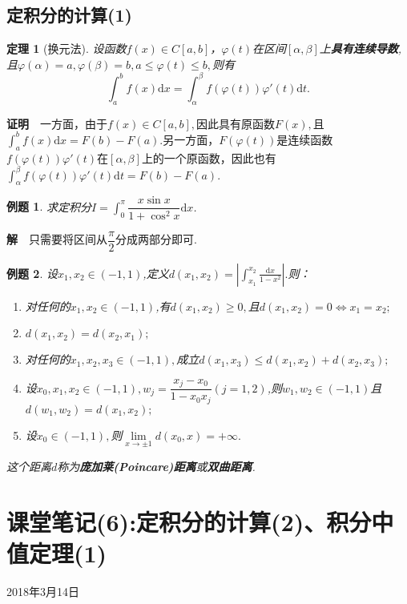 \documentclass[UTF8]{article}
\newcommand{\dx}{\mathrm{d}x}
\newcommand{\zm}{\textbf{证明}$\quad$}
\newcommand{\jie}{\textbf{解}$\quad$}
\newtheorem{thm}{\hspace{2em}定理}[section]
\newtheorem{exa}{\hspace{2em}例题}[section]
\begin{document}
\subsection{定积分的计算(1)}
\begin{thm}[换元法]
  设函数$f(x)\in C[a,b]$，$\varphi(t)$在区间$[\alpha,\beta]$上\textbf{具有连续导数},且$\varphi(\alpha)=a,\varphi(\beta)=b,
  a\le\varphi(t)\le b,$则有
  $$\int_a^bf(x)\dx=\int_\alpha^\beta f(\varphi(t))\varphi'(t)\mathrm{d}t.$$
\end{thm}
\zm 一方面，由于$f(x)\in C[a,b],$因此具有原函数$F(x),$且$\int_a^bf(x)\dx=F(b)-F(a).$另一方面，$F(\varphi(t))$是连续函数
$f(\varphi(t))\varphi'(t)$在$[\alpha,\beta]$上的一个原函数，因此也有$\int_\alpha^\beta f(\varphi(t))\varphi'(t)\mathrm{d}t
=F(b)-F(a).$
\begin{exa}
  求定积分$I=\displaystyle\int_0^\pi\dfrac{x\sin x}{1+\cos^2x}\dx$.
\end{exa}
\jie 只需要将区间从$\dfrac{\pi}{2}$分成两部分即可.
\begin{exa}
  设$x_1,x_2\in(-1,1)$,定义$d(x_1,x_2)=|\int_{x_1}^{x_2}\frac{\dx}{1-x^2}|.$则：
  \begin{enumerate}
    \item 对任何的$x_1,x_2\in(-1,1)$,有$d(x_1,x_2)\ge0,$且$d(x_1,x_2)=0\iff x_1=x_2;$
    \item $d(x_1,x_2)=d(x_2,x_1);$
    \item 对任何的$x_1,x_2,x_3\in(-1,1),$成立$d(x_1,x_3)\le d(x_1,x_2)+d(x_2,x_3);$
    \item 设$x_0,x_1,x_2\in(-1,1),w_j=\dfrac{x_j-x_0}{1-x_0x_j}(j=1,2)$,则$w_1,w_2\in(-1,1)$且$d(w_1,w_2)=d(x_1,x_2);$
    \item 设$x_0\in(-1,1),$则$\lim\limits_{x\to\pm1}d(x_0,x)=+\infty.$
  \end{enumerate}
  这个距离$d$称为\textbf{庞加莱(Poincare)距离}或\textbf{双曲距离}.
\end{exa}
\clearpage

\section{课堂笔记(6):定积分的计算(2)、积分中值定理(1)}
\begin{center}
  2018年3月14日
\end{center}
\end{document}
